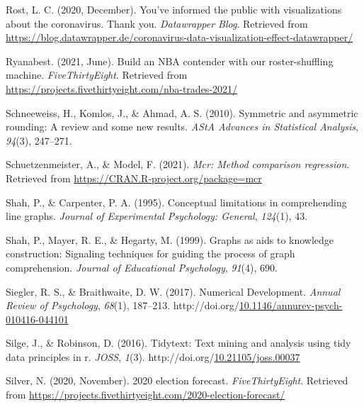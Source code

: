 \documentclass[print]{nuthesis}
\newlength{\cslhangindent}
\newenvironment{CSLReferences}[2]%
{\setlength{\parindent}{0pt}%
\everypar{\setlength{\hangindent}{\cslhangindent}}\ignorespaces}%
{\par}
\begin{document}
\begin{CSLReferences}{1}{0}
\leavevmode{}%
Rost, L. C. (2020, December). You've informed the public with visualizations about the coronavirus. Thank you. \emph{Datawrapper Blog}. Retrieved from \url{https://blog.datawrapper.de/coronavirus-data-visualization-effect-datawrapper/}

\leavevmode{}%
Ryanabest. (2021, June). Build an NBA contender with our roster-shuffling machine. \emph{FiveThirtyEight}. Retrieved from \url{https://projects.fivethirtyeight.com/nba-trades-2021/}

\leavevmode{}%
Schneeweiss, H., Komlos, J., \& Ahmad, A. S. (2010). Symmetric and asymmetric rounding: A review and some new results. \emph{AStA Advances in Statistical Analysis}, \emph{94}(3), 247--271.

\leavevmode{}%
Schuetzenmeister, A., \& Model, F. (2021). \emph{Mcr: Method comparison regression}. Retrieved from \url{https://CRAN.R-project.org/package=mcr}

\leavevmode{}%
Shah, P., \& Carpenter, P. A. (1995). Conceptual limitations in comprehending line graphs. \emph{Journal of Experimental Psychology: General}, \emph{124}(1), 43.

\leavevmode{}%
Shah, P., Mayer, R. E., \& Hegarty, M. (1999). Graphs as aids to knowledge construction: Signaling techniques for guiding the process of graph comprehension. \emph{Journal of Educational Psychology}, \emph{91}(4), 690.

\leavevmode{}%
Siegler, R. S., \& Braithwaite, D. W. (2017). Numerical {Development}. \emph{Annual Review of Psychology}, \emph{68}(1), 187--213. http://doi.org/\href{https://doi.org/10.1146/annurev-psych-010416-044101}{10.1146/annurev-psych-010416-044101}

\leavevmode{}%
Silge, J., \& Robinson, D. (2016). Tidytext: Text mining and analysis using tidy data principles in r. \emph{JOSS}, \emph{1}(3). http://doi.org/\href{https://doi.org/10.21105/joss.00037}{10.21105/joss.00037}

\leavevmode{}%
Silver, N. (2020, November). 2020 election forecast. \emph{FiveThirtyEight}. Retrieved from \url{https://projects.fivethirtyeight.com/2020-election-forecast/}


\end{CSLReferences}
\end{document}
